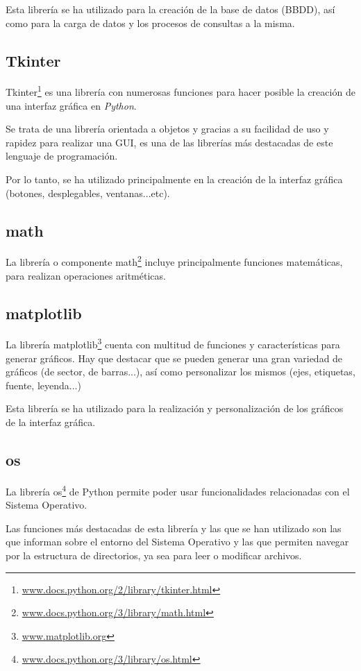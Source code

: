 Esta librería se ha utilizado para la creación de la base de datos (BBDD), así como para la carga de datos y los procesos de consultas a la misma.

\subsection{Tkinter}
Tkinter\footnote{\href{https://docs.python.org/2/library/tkinter.html}{www.docs.python.org/2/library/tkinter.html}} es una librería con numerosas funciones para hacer posible la creación de una interfaz gráfica en \emph{Python}.

Se trata de una librería orientada a objetos y gracias a su facilidad de uso y rapidez para realizar una GUI, es una de las librerías más destacadas de este lenguaje de programación.

Por lo tanto, se ha utilizado principalmente en la creación de la interfaz gráfica (botones, desplegables, ventanas...etc).


\subsection{math}
La librería o componente math\footnote{\href{https://docs.python.org/3/library/math.html}{www.docs.python.org/3/library/math.html}} incluye principalmente funciones matemáticas, para realizan operaciones aritméticas. 


\subsection{matplotlib}
La librería matplotlib\footnote{\href{https://matplotlib.org/}{www.matplotlib.org}} cuenta con multitud de funciones y características para generar gráficos. Hay que destacar que se pueden generar una gran variedad de gráficos (de sector, de barras...), así como personalizar los mismos (ejes, etiquetas, fuente, leyenda...)

Esta librería se ha utilizado para la realización y personalización de los gráficos de la interfaz gráfica.


\subsection{os}
La librería os\footnote{\href{https://docs.python.org/3/library/os.html}{www.docs.python.org/3/library/os.html}} de Python permite poder usar funcionalidades relacionadas con el Sistema Operativo. 

Las funciones más destacadas de esta librería y las que se han utilizado son las que informan sobre el entorno del Sistema Operativo y las que permiten navegar por la estructura de directorios, ya sea para leer o modificar archivos.


